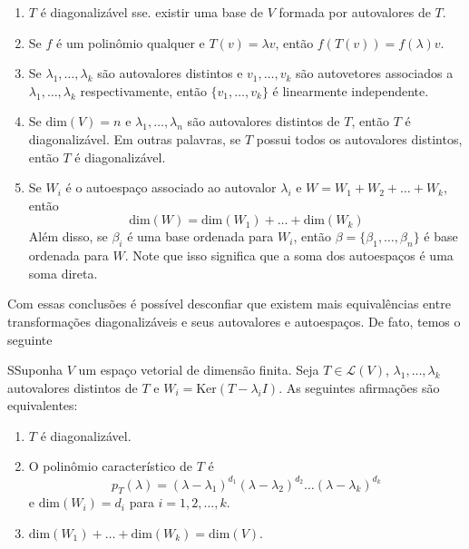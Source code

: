 \documentclass[12pt,a4paper]{article}
\begin{document}
\begin{enumerate}
\item $T$ é diagonalizável sse. existir uma base de $V$ formada por autovalores de $T$.
\item Se $f$ é um polinômio qualquer e $T(v)=\lambda v$, então $f(T(v)) = f(\lambda)v$.
\item Se $\lambda_1, \ldots, \lambda_k$ são autovalores distintos e $v_1, \ldots, v_k$ são autovetores associados a $\lambda_1, \ldots, \lambda_k$ respectivamente, então $\{ v_1, \ldots, v_k \}$ é linearmente independente.
\item Se $\text{dim}(V)=n$ e $\lambda_1, \ldots, \lambda_n$ são autovalores distintos de $T$, então $T$ é diagonalizável. Em outras palavras, se $T$ possui todos os autovalores distintos, então $T$ é diagonalizável.
\item Se $W_i$ é o autoespaço associado ao autovalor $\lambda_i$ e $W = W_1 + W_2 + \ldots + W_k$, então \[ \text{dim} (W) = \text{dim} (W_1) + \ldots + \text{dim} (W_k) \] Além disso, se $\beta_i$ é uma base ordenada para $W_i$, então $\beta = \{ \beta_1, \ldots, \beta_n \}$ é base ordenada para $W$. Note que isso significa que a soma dos autoespaços é uma soma direta.
\end{enumerate}

Com essas conclusões é possível desconfiar que existem mais equivalências entre transformações diagonalizáveis e seus autovalores e autoespaços. De fato, temos o seguinte

\begin{teorema}{}
  SSuponha $V$ um espaço vetorial de dimensão finita. Seja $T \in \mathcal{L}(V)$, $\lambda_1, \ldots, \lambda_k$ autovalores distintos de $T$ e $W_i = \text{Ker}(T - \lambda_i I)$. As seguintes afirmações são equivalentes:
\begin{enumerate}
\item $T$ é diagonalizável.
\item O polinômio característico de $T$ é \[ p_T(\lambda) = (\lambda - \lambda_1)^{d_1} (\lambda - \lambda_2)^{d_2} \ldots (\lambda - \lambda_k)^{d_k} \] e $\text{dim}(W_i) = d_i$ para $i = 1, 2, \ldots, k$.
\item $\text{dim}(W_1) + \ldots + \text{dim}(W_k) = \text{dim}(V)$.
\end{enumerate}
\end{teorema}
\end{document}

